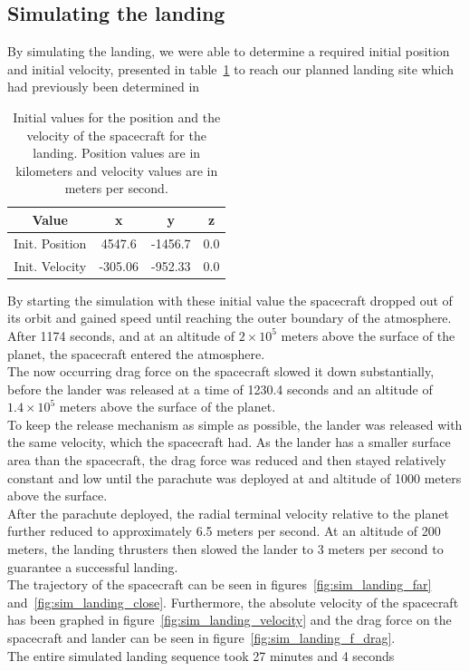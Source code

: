 \documentclass[reprint,english,notitlepage]{revtex4-2}
\begin{document}
\subsection{Simulating the landing}\label{subsec:simulating-the-landing}
    By simulating the landing, we were able to determine a required initial position and initial velocity, presented in table~\ref{tab:initial_values} to reach our planned landing site which had previously been determined in~\parencite[][]{part6}

    \begin{table}[h]
        \begin{tabular}{|c|c|c|c|}
            \hline
            Value & x & y & z \\
            \hline
            Init. Position & 4547.6 & -1456.7 & 0.0\\
            \hline
            Init. Velocity & -305.06 & -952.33 & 0.0\\
            \hline
        \end{tabular}
        \caption{Initial values for the position and the velocity of the spacecraft for the landing. Position values are in kilometers and velocity values are in meters per second.}
        \label{tab:initial_values}
    \end{table}

    By starting the simulation with these initial value the spacecraft dropped out of its orbit and gained speed until reaching the outer boundary of the atmosphere.
    After 1174 seconds, and at an altitude of $2 \times 10^5$ meters above the surface of the planet, the spacecraft entered the atmosphere.\\
    The now occurring drag force on the spacecraft slowed it down substantially, before the lander was released at a time of 1230.4 seconds and an altitude of $1.4 \times 10^5$ meters above the surface of the planet.\\
    To keep the release mechanism as simple as possible, the lander was released with the same velocity, which the spacecraft had.
    As the lander has a smaller surface area than the spacecraft, the drag force was reduced and then stayed relatively constant and low until the parachute was deployed at and altitude of 1000 meters above the surface.\\
    After the parachute deployed, the radial terminal velocity relative to the planet further reduced to approximately 6.5 meters per second.
    At an altitude of 200 meters, the landing thrusters then slowed the lander to 3 meters per second to guarantee a successful landing.\\
    The trajectory of the spacecraft can be seen in figures~\ref{fig:sim_landing_far} and~\ref{fig:sim_landing_close}.
    Furthermore, the absolute velocity of the spacecraft has been graphed in figure~\ref{fig:sim_landing_velocity} and the drag force on the spacecraft and lander can be seen in figure~\ref{fig:sim_landing_f_drag}.\\
    The entire simulated landing sequence took  27 minutes and 4 seconds
\end{document}
